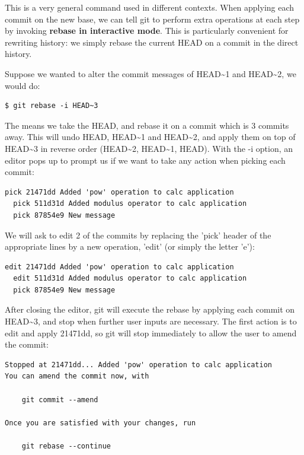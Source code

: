 \documentclass[a4paper]{../../common/tufte-latex/tufte-handout}
\begin{document}
This is a very general command used in different contexts.
When applying each commit on the new base, we can tell git to perform extra operations at each step by invoking \textbf{rebase in interactive mode}.
This is particularly convenient for rewriting history: we simply rebase the current HEAD on a commit in the direct history.

Suppose we wanted to alter the commit messages of HEAD\textasciitilde1 and HEAD\textasciitilde2, we would do:
\begin{lstlisting}[style=BashInputStyle]
  $ git rebase -i HEAD~3
\end{lstlisting}

The means we take the HEAD, and rebase it on a commit which is 3 commits away.
This will undo HEAD, HEAD\textasciitilde1 and HEAD\textasciitilde2, and apply them on top of HEAD\textasciitilde3 in reverse order (HEAD\textasciitilde2, HEAD\textasciitilde1, HEAD). 
With the -i option, an editor pops up to prompt us if we want to take any action when picking each commit:

\begin{lstlisting}[style=BashInputStyle]
  pick 21471dd Added 'pow' operation to calc application
  pick 511d31d Added modulus operator to calc application
  pick 87854e9 New message
\end{lstlisting}

We will ask to edit 2 of the commits by replacing the 'pick' header of the appropriate lines by a new operation, 'edit' (or simply the letter 'e'):

\begin{lstlisting}[style=BashInputStyle]
  edit 21471dd Added 'pow' operation to calc application
  edit 511d31d Added modulus operator to calc application
  pick 87854e9 New message
\end{lstlisting}

After closing the editor, git will execute the rebase by applying each commit on HEAD\textasciitilde3, and stop when further user inputs are necessary.
The first action is to edit and apply 21471dd, so git will stop immediately to allow the user to amend the commit:

\begin{lstlisting}[style=BashInputStyle]
Stopped at 21471dd... Added 'pow' operation to calc application
You can amend the commit now, with

	git commit --amend

Once you are satisfied with your changes, run

	git rebase --continue
\end{lstlisting}
\end{document}
